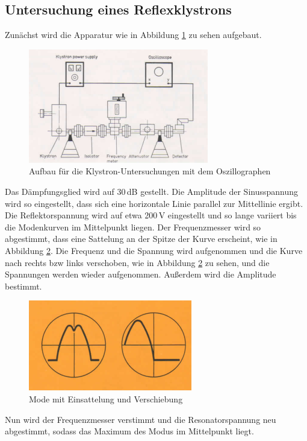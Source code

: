     \subsection{Untersuchung eines Reflexklystrons}
    Zunächst wird die Apparatur wie in Abbildung \ref{fig:Aufbauklystron} zu sehen aufgebaut.
    \begin{figure}
      \centering
      \includegraphics[scale = 0.8]{pictures/aufbauKlystron.png}
      \caption{Aufbau für die Klystron-Untersuchungen mit dem Oszillographen\cite{anleitung}}
      \label{fig:Aufbauklystron}
    \end{figure}
    Das Dämpfungsglied wird auf 30\,dB gestellt.
    Die Amplitude der Sinusspannung wird so eingestellt, dass sich eine horizontale Linie parallel zur Mittellinie ergibt.
    Die Reflektorspannung wird auf etwa 200\,V eingestellt und so lange variiert bis die Modenkurven im Mittelpunkt liegen.
    Der Frequenzmesser wird so abgestimmt, dass eine Sattelung an der Spitze der Kurve erscheint, wie in Abbildung \ref{fig:Mode}.
    Die Frequenz und die Spannung wird aufgenommen und die Kurve nach rechts bzw links verschoben,
    wie in Abbildung \ref{fig:Mode} zu sehen, und die Spannungen werden wieder aufgenommen.
    Außerdem wird die Amplitude bestimmt.
    \begin{figure}
      \centering
      \includegraphics[scale=0.8]{pictures/Mode.png}
      \caption{Mode mit Einsattelung und Verschiebung\cite{anleitung}}
      \label{fig:Mode}
    \end{figure}
    Nun wird der Frequenzmesser verstimmt und die Resonatorspannung neu abgestimmt,
    sodass das Maximum des Modus im Mittelpunkt liegt.
